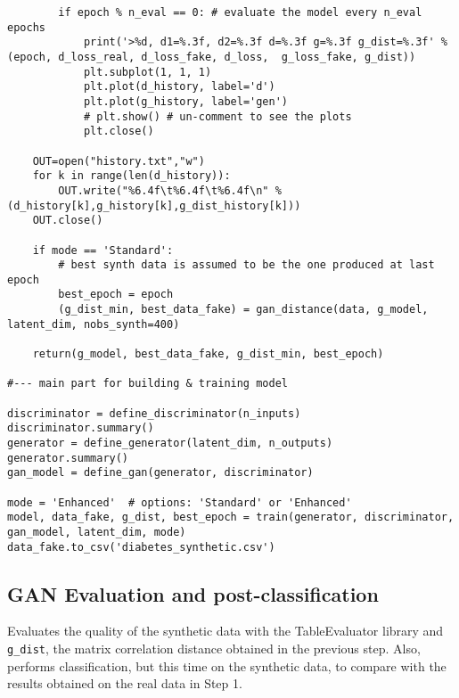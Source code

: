 \documentclass[oneside,10pt]{book}
\begin{document}
\begin{lstlisting}
        if epoch % n_eval == 0: # evaluate the model every n_eval epochs
            print('>%d, d1=%.3f, d2=%.3f d=%.3f g=%.3f g_dist=%.3f' % (epoch, d_loss_real, d_loss_fake, d_loss,  g_loss_fake, g_dist))       
            plt.subplot(1, 1, 1)
            plt.plot(d_history, label='d')
            plt.plot(g_history, label='gen')
            # plt.show() # un-comment to see the plots
            plt.close()
       
    OUT=open("history.txt","w")
    for k in range(len(d_history)):
        OUT.write("%6.4f\t%6.4f\t%6.4f\n" %(d_history[k],g_history[k],g_dist_history[k]))
    OUT.close()
    
    if mode == 'Standard':
        # best synth data is assumed to be the one produced at last epoch
        best_epoch = epoch
        (g_dist_min, best_data_fake) = gan_distance(data, g_model, latent_dim, nobs_synth=400)
       
    return(g_model, best_data_fake, g_dist_min, best_epoch) 

#--- main part for building & training model

discriminator = define_discriminator(n_inputs)
discriminator.summary()
generator = define_generator(latent_dim, n_outputs)
generator.summary()
gan_model = define_gan(generator, discriminator)

mode = 'Enhanced'  # options: 'Standard' or 'Enhanced'
model, data_fake, g_dist, best_epoch = train(generator, discriminator, gan_model, latent_dim, mode)
data_fake.to_csv('diabetes_synthetic.csv') 
\end{lstlisting}

\subsection{GAN Evaluation and post-classification}\label{lasravc}

Evaluates the quality of the synthetic data with the TableEvaluator library
 and \texttt{g\_dist}, the matrix correlation distance obtained in the previous step. Also, performs classification, but this time 
on the synthetic data, to compare with the results obtained on the real data in Step 1.\vspace{1ex}
\end{document}
